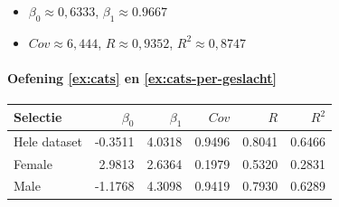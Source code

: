 \begin{itemize}
  \item $\beta_{0} \approx 0,6333$, $\beta_{1} \approx 0.9667$
  \item $Cov \approx 6,444$, $R \approx 0,9352$, $R^2 \approx 0,8747$
\end{itemize}

\paragraph{Oefening \ref{ex:cats} en \ref{ex:cats-per-geslacht}}

\begin{center}
  \begin{tabular}{lrrrrr}
  	\toprule
    \textbf{Selectie} & \textbf{$\beta_{0}$} & \textbf{$\beta_{1}$} & \textbf{$Cov$} & \textbf{$R$} & \textbf{$R^2$} \\
    \midrule
  	Hele dataset & -0.3511 & 4.0318 & 0.9496 & 0.8041 & 0.6466 \\
  	Female       &  2.9813 & 2.6364 & 0.1979 & 0.5320 & 0.2831 \\
  	Male         & -1.1768 & 4.3098 & 0.9419 & 0.7930 & 0.6289 \\
    \bottomrule
  \end{tabular}
\end{center}

